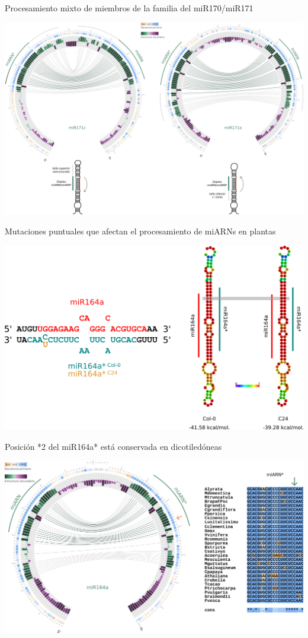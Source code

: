 \documentclass{beamer}
\begin{document}
\begin{frame}{Procesamiento mixto de miembros de la familia del miR170/miR171}
	\begin{center}
		\includegraphics[width=1\textwidth]{img/familia_miR171_circos.png}
	\end{center}
\end{frame}

\begin{frame}{Mutaciones puntuales que afectan el procesamiento de miARNs en plantas}
	\begin{center}
		\includegraphics[width=.7\textwidth]{img/miR164_ss_bp.png}
	\end{center}
\end{frame}

\begin{frame}{Posición *2 del miR164a* está conservada  en dicotiledóneas}
	\begin{center}
		\includegraphics[width=.8\textwidth]{img/miR164a_circos.png}
	\end{center}
    \begin{center}
    \end{center}
\end{frame}
\end{document}
